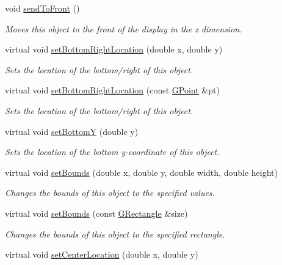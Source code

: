 \begin{DoxyCompactItemize}
void \mbox{\hyperlink{classGObject_aee33d68488e46827ef55fac07f40a9b2}{send\+To\+Front}} ()
\begin{DoxyCompactList}\small\item\em Moves this object to the front of the display in the {\itshape z} dimension. \end{DoxyCompactList}\item 
virtual void \mbox{\hyperlink{classGObject_a71ff7b16b8f1bdc4a1ce9f30cf8b87d8}{set\+Bottom\+Right\+Location}} (double x, double y)
\begin{DoxyCompactList}\small\item\em Sets the location of the bottom/right of this object. \end{DoxyCompactList}\item 
virtual void \mbox{\hyperlink{classGObject_ac6f7320321182f1d18c1c0fa97d5e941}{set\+Bottom\+Right\+Location}} (const \mbox{\hyperlink{classGPoint}{G\+Point}} \&pt)
\begin{DoxyCompactList}\small\item\em Sets the location of the bottom/right of this object. \end{DoxyCompactList}\item 
virtual void \mbox{\hyperlink{classGObject_a4b20e93c2a2597484f74ee5caa71f41f}{set\+BottomY}} (double y)
\begin{DoxyCompactList}\small\item\em Sets the location of the bottom y-\/coordinate of this object. \end{DoxyCompactList}\item 
virtual void \mbox{\hyperlink{classGObject_a2aae8197624b72265ab83b4f1bc73f2f}{set\+Bounds}} (double x, double y, double width, double height)
\begin{DoxyCompactList}\small\item\em Changes the bounds of this object to the specified values. \end{DoxyCompactList}\item 
virtual void \mbox{\hyperlink{classGObject_acada386653f008cacc7cce86426bef7c}{set\+Bounds}} (const \mbox{\hyperlink{classGRectangle}{G\+Rectangle}} \&size)
\begin{DoxyCompactList}\small\item\em Changes the bounds of this object to the specified rectangle. \end{DoxyCompactList}\item 
virtual void \mbox{\hyperlink{classGObject_a290b47dd8de1be44089f95cb2c47c1de}{set\+Center\+Location}} (double x, double y)

\end{DoxyCompactItemize}

